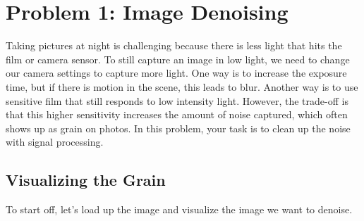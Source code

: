 \documentclass[11pt]{article}
\begin{document}
    \section{Problem 1: Image Denoising}\label{problem-1-image-denoising}

Taking pictures at night is challenging because there is less light that
hits the film or camera sensor. To still capture an image in low light,
we need to change our camera settings to capture more light. One way is
to increase the exposure time, but if there is motion in the scene, this
leads to blur. Another way is to use sensitive film that still responds
to low intensity light. However, the trade-off is that this higher
sensitivity increases the amount of noise captured, which often shows up
as grain on photos. In this problem, your task is to clean up the noise
with signal processing.

    \subsection{Visualizing the Grain}\label{visualizing-the-grain}

To start off, let's load up the image and visualize the image we want to
denoise.
\end{document}
